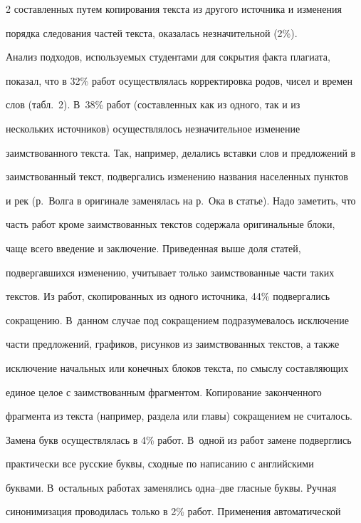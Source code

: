 \begin{multicols}{2}
составленных путем копирования текста из другого источника и изменения 

порядка следования частей текста, оказалась незначительной (2\%).







  Анализ подходов, используемых студентами для сокрытия факта плагиата, 

показал, что в 32\% работ осуществлялась корректировка родов, чисел и времен 

слов (табл.~2). В~38\% работ (составленных как из одного, так и из 

нескольких источников) осуществлялось незначительное изменение 

заимствованного текста. Так, например, делались вставки слов и предложений в 

заимствованный текст, подвергались изменению названия населенных пунктов 

и рек (р.~Волга в оригинале заменялась на р.~Ока в статье). Надо заметить, что 

часть работ кроме заимствованных текстов содержала оригинальные блоки, 

чаще всего введение и заключение. Приведенная выше доля статей, 

подвергавшихся изменению, учитывает только заимствованные части таких 

текстов. Из работ, скопированных из одного источника, 44\% подвергались 

сокращению. В~данном случае под сокращением подразумевалось исключение 

части предложений, графиков, рисунков из заимствованных текстов, а также 

исключение начальных или конечных блоков текста, по смыслу составляющих 

единое целое с заимствованным фрагментом. Копирование законченного 

фрагмента из текста (например, раздела или главы) сокращением не считалось. 

Замена букв осуществлялась в 4\% работ. В~одной из работ замене подверглись 

практически все русские буквы, сходные по написанию с английскими 

буквами. В~остальных работах заменялись одна--две гласные буквы. Ручная 

синонимизация проводилась только в 2\% работ. Применения автоматической 


\end{multicols}
